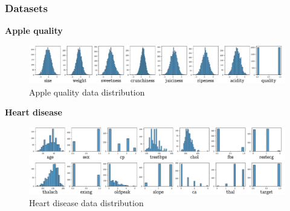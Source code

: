 \documentclass{beamer}
\begin{document}
\begin{frame}
    \frametitle{Datasets}

    \textbf{Apple quality}
    \begin{figure}
        \centering
        \includegraphics[width=\linewidth]{./img/apple_distribution.pdf}
        \caption{Apple quality data distribution}
    \end{figure}

    \textbf{Heart disease}
    \begin{figure}
        \centering
        \includegraphics[width=\linewidth]{./img/heart_distribution.pdf}
        \caption{Heart disease data distribution}
    \end{figure}
\end{frame}
\end{document}
